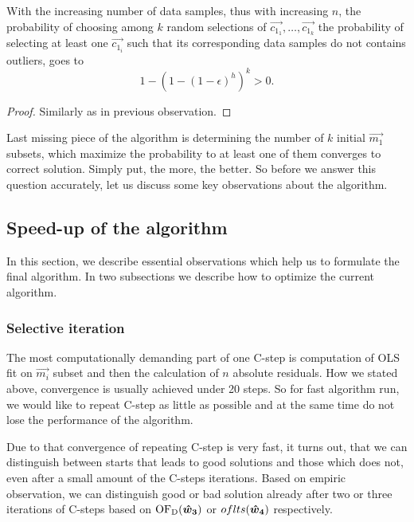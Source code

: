 \begin{observation} \label{prandomsamples}
    With the increasing number of data samples, thus with increasing $n$, the probability of choosing among $k$ random selections of $\vec{c_{1_1}}, \ldots, \vec{c_{1_k}}$ the probability of selecting at least one $\vec{c_{1_i}}$ such that its corresponding data samples do not contains outliers, goes to
\begin{equation}
    1-(1-(1-\epsilon)^h)^k  > 0.
\end{equation}
\end{observation}

\begin{proof}
    Similarly as in previous observation.
\end{proof}

Last missing piece of the algorithm is determining the number of $k$ initial $\vec{m_1}$ subsets, which maximize the probability to at least one of them converges to correct solution. Simply put, the more, the better. So before we answer this question accurately, let us discuss some key observations about the algorithm.


\subsection{Speed-up of the algorithm}
In this section, we describe essential observations which help us to formulate the final algorithm. In two subsections we describe how to optimize the current algorithm. 

\subsubsection*{Selective iteration}
The most computationally demanding part of one C-step is computation of OLS fit on $\vec{m_i}$ subset and then the calculation of $n$ absolute residuals. How we stated above, convergence is usually achieved under 20 steps. So for fast algorithm run, we would like to repeat C-step as little as possible and at the same time do not lose the performance of the algorithm. 

Due to that convergence of repeating C-step is very fast, it turns out, that we can distinguish between starts that leads to good solutions and those which does not, even after a small amount of the C-steps iterations. Based on empiric observation, we can distinguish good or bad solution already after two or three iterations of C-steps based on $\operatorname{OF_D}(\boldsymbol{\hat{w}_3})$ or $oflts(\boldsymbol{\hat{w}_4})$ respectively. 

